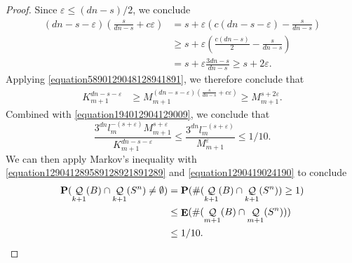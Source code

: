 \documentclass[12pt,reqno]{article}
\numberwithin{equation}{section}
\DeclareMathOperator{\EE}{\mathbf{E}}
\DeclareMathOperator{\DQ}{\mathcal{Q}}
\begin{document}
\begin{proof}
    Since $\varepsilon \leq (dn - s)/2$, we conclude
    \begin{align*}
        \left( dn - s - \varepsilon \right) \left( \frac{s}{dn - s} + c\varepsilon \right) &= s + \varepsilon \left( c(dn - s - \varepsilon) - \frac{s}{dn - s} \right)\\
        &\geq s + \varepsilon \left( \frac{c(dn - s)}{2} - \frac{s}{dn - s} \right)\\
        &= s + \varepsilon \frac{3dn - s}{dn - s} \geq s + 2\varepsilon.
    \end{align*}
    Applying \eqref{equation5890129048128941891}, we therefore conclude that
    \begin{align*}
        K_{m+1}^{dn - s - \varepsilon} &\geq M_{m+1}^{(dn - s - \varepsilon) \left( \frac{s}{dn - s} + c\varepsilon \right)} \geq M_{m+1}^{s + 2 \varepsilon}.
    \end{align*}
    Combined with \eqref{equation194012904129009}, we conclude that
    \begin{equation} \label{equation1290419024190}
        \frac{3^{dn} l_m^{-(s + \varepsilon)} M_{m+1}^{s + \varepsilon}}{K_{m+1}^{dn - s - \varepsilon}} \leq \frac{3^{dn} l_m^{-(s + \varepsilon)}}{M_{m+1}^\varepsilon} \leq 1/10.
    \end{equation}
    We can then apply Markov's inequality with \eqref{equation129041289589128921891289} and \eqref{equation1290419024190} to conclude
    \begin{equation} \label{fourierdim2}
    \begin{split}
        \mathbf{P}(\DQ_{k+1}(B) \cap \DQ_{k+1}(S^n) \neq \emptyset) &= \mathbf{P}(\# (\DQ_{k+1}(B) \cap \DQ_{k+1}(S^n)) \geq 1)\\
        &\leq \EE(\#(\DQ_{m+1}(B) \cap \DQ_{m+1}(S^n)))\\
        &\leq 1/10. \qedhere
    \end{split}
    \end{equation}
\end{proof}
\end{document}
